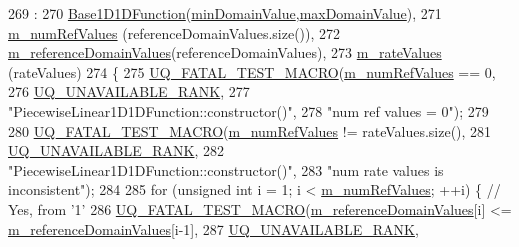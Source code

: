 \begin{DoxyCode}
269   :
270   \hyperlink{class_q_u_e_s_o_1_1_base1_d1_d_function_a8e8c0f8d500675e4acfd4d7043000791}{Base1D1DFunction}(\hyperlink{class_q_u_e_s_o_1_1_base1_d1_d_function_a4c110e621ef1ac557bbcc60d41f5a3c2}{minDomainValue},\hyperlink{class_q_u_e_s_o_1_1_base1_d1_d_function_ad2b80d0c52c0cb56c89f70f30b3bb19e}{maxDomainValue}),
271   \hyperlink{class_q_u_e_s_o_1_1_piecewise_linear1_d1_d_function_a1ff5c7e5243f6a763409a68e86681129}{m\_numRefValues}         (referenceDomainValues.size()),
272   \hyperlink{class_q_u_e_s_o_1_1_piecewise_linear1_d1_d_function_abda9e4143096bf0bf935b7c9173aa2cc}{m\_referenceDomainValues}(referenceDomainValues),
273   \hyperlink{class_q_u_e_s_o_1_1_piecewise_linear1_d1_d_function_aef7d37fe499c0e8f3bb6261f1b4e8147}{m\_rateValues}           (rateValues)
274 \{
275   \hyperlink{_defines_8h_a56d63d18d0a6d45757de47fcc06f574d}{UQ\_FATAL\_TEST\_MACRO}(\hyperlink{class_q_u_e_s_o_1_1_piecewise_linear1_d1_d_function_a1ff5c7e5243f6a763409a68e86681129}{m\_numRefValues} == 0,
276                       \hyperlink{namespace_q_u_e_s_o_a7d4679800a430ae8e473c1c7bc0bfb21}{UQ\_UNAVAILABLE\_RANK},
277                       \textcolor{stringliteral}{"PiecewiseLinear1D1DFunction::constructor()"},
278                       \textcolor{stringliteral}{"num ref values = 0"});
279 
280   \hyperlink{_defines_8h_a56d63d18d0a6d45757de47fcc06f574d}{UQ\_FATAL\_TEST\_MACRO}(\hyperlink{class_q_u_e_s_o_1_1_piecewise_linear1_d1_d_function_a1ff5c7e5243f6a763409a68e86681129}{m\_numRefValues} != rateValues.size(),
281                       \hyperlink{namespace_q_u_e_s_o_a7d4679800a430ae8e473c1c7bc0bfb21}{UQ\_UNAVAILABLE\_RANK},
282                       \textcolor{stringliteral}{"PiecewiseLinear1D1DFunction::constructor()"},
283                       \textcolor{stringliteral}{"num rate values is inconsistent"});
284 
285   \textcolor{keywordflow}{for} (\textcolor{keywordtype}{unsigned} \textcolor{keywordtype}{int} i = 1; i < \hyperlink{class_q_u_e_s_o_1_1_piecewise_linear1_d1_d_function_a1ff5c7e5243f6a763409a68e86681129}{m\_numRefValues}; ++i) \{ \textcolor{comment}{// Yes, from '1'}
286     \hyperlink{_defines_8h_a56d63d18d0a6d45757de47fcc06f574d}{UQ\_FATAL\_TEST\_MACRO}(\hyperlink{class_q_u_e_s_o_1_1_piecewise_linear1_d1_d_function_abda9e4143096bf0bf935b7c9173aa2cc}{m\_referenceDomainValues}[i] <= 
      \hyperlink{class_q_u_e_s_o_1_1_piecewise_linear1_d1_d_function_abda9e4143096bf0bf935b7c9173aa2cc}{m\_referenceDomainValues}[i-1],
287                         \hyperlink{namespace_q_u_e_s_o_a7d4679800a430ae8e473c1c7bc0bfb21}{UQ\_UNAVAILABLE\_RANK},

\end{DoxyCode}
